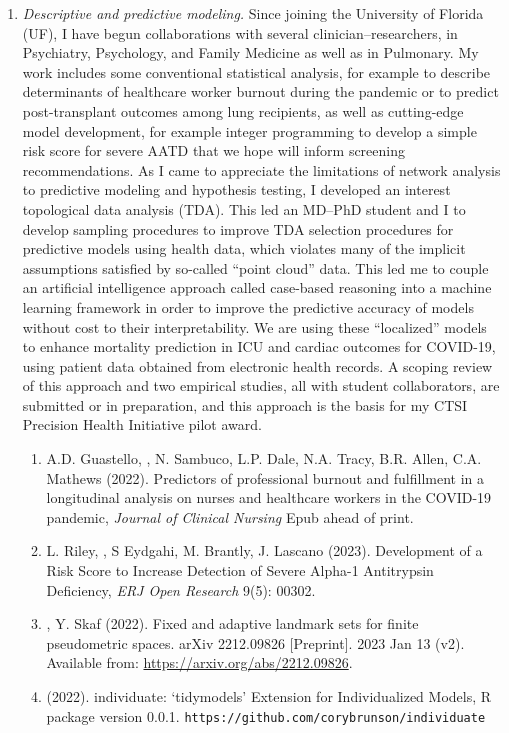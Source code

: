 \documentclass{nihbiosketch}
\begin{document}
\begin{enumerate}
\item \emph{Descriptive and predictive modeling.}
Since joining the University of Florida (UF), I have begun collaborations with several clinician--researchers, in Psychiatry, Psychology, and Family Medicine as well as in Pulmonary.
My work includes some conventional statistical analysis, for example to describe determinants of healthcare worker burnout during the pandemic or to predict post-transplant outcomes among lung recipients, as well as cutting-edge model development, for example integer programming to develop a simple risk score for severe AATD that we hope will inform screening recommendations.
As I came to appreciate the limitations of network analysis to predictive modeling and hypothesis testing, I developed an interest topological data analysis (TDA). This led an MD--PhD student and I to develop sampling procedures to improve TDA selection procedures for predictive models using health data, which violates many of the implicit assumptions satisfied by so-called ``point cloud'' data.
This led me to couple an artificial intelligence approach called case-based reasoning into a machine learning framework in order to improve the predictive accuracy of models without cost to their interpretability. We are using these ``localized'' models to enhance mortality prediction in ICU and cardiac outcomes for COVID-19, using patient data obtained from electronic health records. A scoping review of this approach and two empirical studies, all with student collaborators, are submitted or in preparation, and this approach is the basis for my CTSI Precision Health Initiative pilot award.

\begin{enumerate}
\item A.D. Guastello, , N. Sambuco, L.P. Dale, N.A. Tracy, B.R. Allen, C.A. Mathews (2022). Predictors of professional burnout and fulfillment in a longitudinal analysis on nurses and healthcare workers in the COVID-19 pandemic, \emph{Journal of Clinical Nursing} Epub ahead of print.
\item L. Riley, , S Eydgahi, M. Brantly, J. Lascano (2023). Development of a Risk Score to Increase Detection of Severe Alpha-1 Antitrypsin Deficiency, \emph{ERJ Open Research} 9(5): 00302.
\item {}, Y. Skaf (2022). Fixed and adaptive landmark sets for finite pseudometric spaces. arXiv 2212.09826 [Preprint]. 2023 Jan 13 (v2).  Available from: \url{https://arxiv.org/abs/2212.09826}.
\item {} (2022). individuate: `tidymodels' Extension for Individualized Models, R package version 0.0.1. \nolinkurl{https://github.com/corybrunson/individuate}
\end{enumerate}


\end{enumerate}
\end{document}
